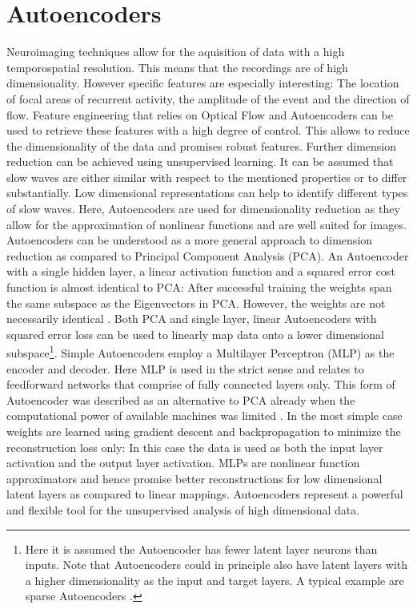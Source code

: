 \section{Autoencoders}
\label{section_autoencoders}
Neuroimaging techniques allow for the aquisition of data with a high temporospatial resolution. This means that the recordings are of high dimensionality. However specific features are especially interesting: The location of focal areas of recurrent activity, the amplitude of the event and the direction of flow. Feature engineering that relies on Optical Flow and Autoencoders can be used to retrieve these features with a high degree of control. This allows to reduce the dimensionality of the data and promises robust features. Further dimension reduction can be achieved using unsupervised learning. It can be assumed that slow waves are either similar with respect to the mentioned properties or to differ substantially. Low dimensional representations can help to identify different types of slow waves. Here, Autoencoders are used for dimensionality reduction as they allow for the approximation of nonlinear functions and are well suited for images.\\
Autoencoders can be understood as a more general approach to dimension reduction as compared to Principal Component Analysis (PCA). An Autoencoder with a single hidden layer, a linear activation function and a squared error cost function is almost identical to PCA: After successful training the weights span the same subspace as the Eigenvectors in PCA. However, the weights are not necessarily identical \parencite{plaut2018principal}. Both PCA and single layer, linear Autoencoders with squared error loss can be used to linearly map data onto a lower dimensional subspace\footnote{Here it is assumed the Autoencoder has fewer latent layer neurons than inputs. Note that Autoencoders could in principle also have latent layers with a higher dimensionality as the input and target layers. A typical example are sparse Autoencoders \parencite{paperswithcode2021sparse}.}.
Simple Autoencoders employ a Multilayer Perceptron (MLP) as the encoder and decoder. Here MLP is used in the strict sense and relates to feedforward networks that comprise of fully connected layers only. This form of Autoencoder was described as an alternative to PCA already when the computational power of available machines was limited \parencite{kramer1991nonlinear}. In the most simple case weights are learned using gradient descent and backpropagation to minimize the reconstruction loss only: In this case the data is used as both the input layer activation and the output layer activation. MLPs are nonlinear function approximators and hence promise better reconstructions for low dimensional latent layers as compared to linear mappings. Autoencoders represent a powerful and flexible tool for the unsupervised analysis of high dimensional data.\\
